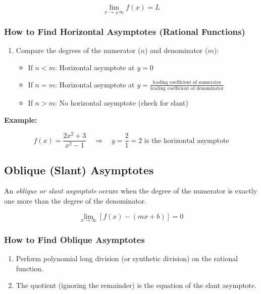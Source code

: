 \[
    \lim_{x \to \pm\infty} f(x) = L
\]

\subsubsection{How to Find Horizontal Asymptotes (Rational Functions)}

\begin{enumerate}

    \item Compare the degrees of the numerator (\(n\)) and denominator (\(m\)):

    \begin{itemize}

        \item If \(n < m\): Horizontal asymptote at \(y = 0\)

        \item If \(n = m\): Horizontal asymptote at \(y = \frac{\text{leading coefficient of numerator}}
        {\text{leading coefficient of denominator}}\)

        \item If \(n > m\): No horizontal asymptote (check for slant)

    \end{itemize}

\end{enumerate}

\textbf{Example:}

\[
    f(x) = \frac{2x^2 + 3}{x^2 - 1} \quad \Rightarrow \quad y = \frac{2}{1} = 2 
    \text{ is the horizontal asymptote}
\]

\subsection{Oblique (Slant) Asymptotes}

An \emph{oblique or slant asymptote} occurs when the degree of the numerator is exactly one more than 
the degree of the denominator.

\[
    \lim_{x \to \infty} [f(x) - (mx + b)] = 0
\]

\subsubsection{How to Find Oblique Asymptotes}

\begin{enumerate}
    
    \item Perform polynomial long division (or synthetic division) on the rational function.
    
    \item The quotient (ignoring the remainder) is the equation of the slant asymptote.

\end{enumerate}

